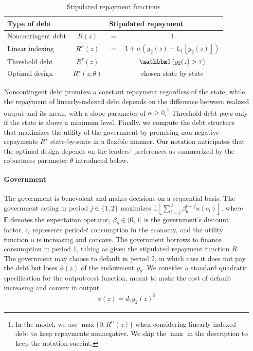 \begin{table}[!hbtp]\centering \small
\caption{Stipulated repayment functions}\label{tab:R(z)}
\begin{tabular}{@{}lccc@{}}\toprule
  \textbf{Type of debt} & \multicolumn{3}{c}{\textbf{Stipulated repayment}} \\\midrule
  Noncontingent debt & $R(z)$ & $ = $ & $1$ \\
  Linear indexing & $R^\alpha(z)$ & $ = $ & $1 + \alpha \left( y_2(z) - \mathbb{E}_1\left[y_2(z)\right] \right) $ \\
  Threshold debt & $R^\tau(z)$ & $ = $ & $\ind\left(y_2(z) > \tau\right)$ \\
  Optimal design & $R^\star(z; \theta)$&       & {\footnotesize chosen state by state}\\\bottomrule
\end{tabular}
\end{table}
Noncontingent debt promises a constant repayment regardless of the state, while the repayment of linearly-indexed debt depends on the difference between realized output and its mean, with a slope parameter of $\alpha \geq 0$.\footnote{In the model, we use $\max\{0,R^\alpha(z)\}$ when considering linearly-indexed debt to keep repayments nonnegative. We skip the $\max$ in the description to keep the notation succint.} Threshold debt pays only if the state is above a minimum level. Finally, we compute the debt structure that maximizes the utility of the government by promising non-negative repayments $R^\star$ state-by-state in a flexible manner. Our notation anticipates that the optimal design depends on the lenders' preferences as summarized by the robustness parameter $\theta$ introduced below.

\paragraph{Government} The government is benevolent and makes decisions on a sequential basis. The government acting in period $j \in \{1,2\}$ maximizes $\mathbb{E} \left[ \sum_{t=j}^2 \beta_b^{t-j} u\left( c_t \right)\right]$, where $\mathbb{E}$ denotes the expectation operator, $\beta_b \in (0,1]$ is the government's discount factor, $c_{t}$ represents period-$t$ consumption in the economy, and the utility function $u$ is increasing and concave. The government borrows to finance consumption in period 1, taking as given the stipulated repayment function $R$. The government may choose to default in period 2, in which case it does not pay the debt but loses $\phi(z)$ of the endowment $y_2$. We consider a standard quadratic specification for the output-cost function, meant to make the cost of default increasing and convex in output
\begin{align*}
  \phi(z) =  d_1 y_2(z)^2
\end{align*}

